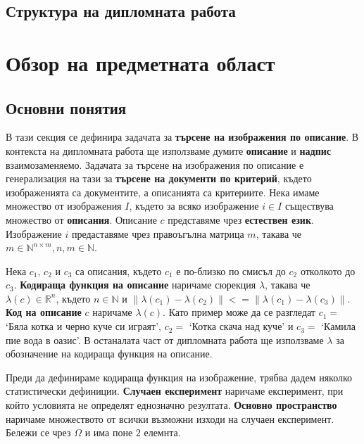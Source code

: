 \documentclass[a4paper,12pt]{article}
\begin{document}
\subsection{Структура на дипломната работа}

\section{Обзор на предметната област}

\subsection{Основни понятия}

В тази секция се дефинира задачата за \textbf{търсене на изображения по описание}. В контекста на дипломната работа ще използваме думите \textbf{описание} и \textbf{надпис} взаимозаменяемо. Задачата за търсене на изображения по описание е генерализация на тази за \textbf{търсене на документи по критерий}, където изображенията са документите, а описанията са критериите. Нека имаме множество от изображения $I$, където за всяко изображение $i \in I$ съществува множество от \textbf{описания}. Описание $c$ представяме чрез \textbf{естествен език}. Изображение $i$ предаставяме чрез правоъгълна матрица $m$, такава че $m \in \mathbb{N}^{n \times m}, n,m \in \mathbb{N}$.

\bigbreak

Нека $c_1$, $c_2$ и $c_3$ са описания, където $c_1$ е по-близко по смисъл до $c_2$ отколкото до $c_3$. \textbf{Кодираща функция на описание} наричаме сюрекция $\lambda$, такава че $\lambda(c) \in \mathbb{R}^n$, където $n \in \mathbb{N}$ и $\| \lambda(c_1) - \lambda(c_2) \| <= \| \lambda(c_1) - \lambda(c_3) \|$. \textbf{Код на описание} $c$ наричаме $\lambda(c)$. Като пример може да се разгледат $c_1 = $ `Бяла котка и черно куче си играят', $c_2 = $ `Котка скача над куче' и $c_3 = $ `Камила пие вода в оазис'. В останалата част от дипломната работа ще използваме $\lambda$ за обозначение на кодираща функция на описание.

\bigbreak

Преди да дефинираме кодираща функция на изображение, трябва дадем няколко статистически дефиниции. \textbf{Случаен експеримент} наричаме експеримент, при който условията не определят еднозначно резултата. \textbf{Основно пространство} наричаме множеството от всички възможни изходи на случаен експеримент. Бележи се чрез $\Omega$ и има поне $2$ елемнта.
\end{document}
